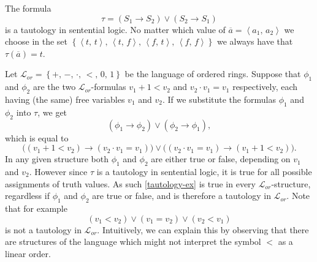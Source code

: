 \documentclass[../../main.tex]{subfiles}
\begin{document}
\begin{example}
    The formula $$\tau = \left(S_1 \rightarrow S_2\right) \vee \left(S_2 \rightarrow S_1\right)$$
    is a tautology in sentential logic.
    No matter which value of $\overline{a} = \left<a_1,\, a_2\right>$ we choose in the set 
    $\left\{\left<t,\, t\right>,\, \left<t,\, f\right>,\, \left<f,\, t\right>,\, \left<f,\, f\right>\right\}$ 
    we always have that $\tau(\overline{a}) = t$.

    Let $\mathcal{L}_{or} = \left\{+,\, -,\, \cdot,\, <,\, 0,\, 1\right\}$ be the language of ordered rings.
    Suppose that $\phi_1$ and $\phi_2$ are the two $\mathcal{L}_{or}$-formulas $v_1 + 1 < v_2$ and $v_2 \cdot v_1 = v_1$ respectively,
    each having (the same) free variables $v_1$ and $v_2$.
    If we substitute the formulas $\phi_1$ and $\phi_2$ into $\tau$, we get
    \begin{equation}\label{tautology-ex}
        \left(\phi_1 \rightarrow \phi_2\right) \vee \left(\phi_2 \rightarrow \phi_1\right),
    \end{equation}
    which is equal to 
    $$\big(\left(v_1 + 1 < v_2\right) \rightarrow \left(v_2 \cdot v_1 = v_1\right)\big) \vee \big(\left(v_2 \cdot v_1 = v_1\right) \rightarrow \left(v_1 + 1 < v_2\right)\big).$$
    In any given structure both $\phi_1$ and $\phi_2$ are either true or false, depending on $v_1$ and $v_2$.
    However since $\tau$ is a tautology in sentential logic, it is true for all possible assignments of truth values.
    As such \eqref{tautology-ex} is true in every $\mathcal{L}_{or}$-structure, regardless if $\phi_1$ and $\phi_2$ are true or false, and is therefore a tautology in $\mathcal{L}_{or}$.
    Note that for example $$(v_1 < v_2) \vee (v_1 = v_2) \vee (v_2 < v_1)$$ is not a tautology in $\mathcal{L}_{or}$.
    Intuitively, we can explain this by observing that there are structures of the language which might not interpret the symbol $<$ as a linear order.
\end{example}
\end{document}
